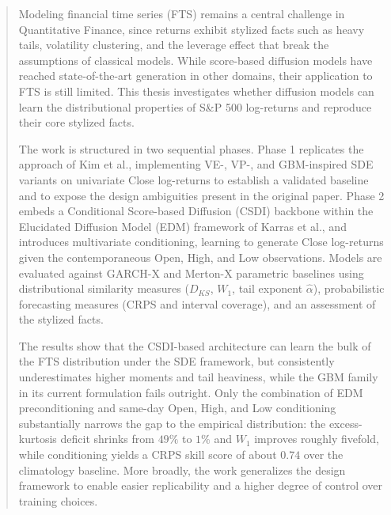 \begin{abstract}
Modeling financial time series (FTS) remains a central challenge in Quantitative Finance, since returns exhibit stylized facts such as heavy tails, volatility clustering, and the leverage effect that break the assumptions of classical models. While score-based diffusion models have reached state-of-the-art generation in other domains, their application to FTS is still limited. This thesis investigates whether diffusion models can learn the distributional properties of S&P 500 log-returns and
reproduce their core stylized facts.

The work is structured in two sequential phases. Phase 1 replicates the approach of
Kim et al., implementing VE-, VP-, and GBM-inspired SDE
variants on univariate Close log-returns to establish a validated baseline and to
expose the design ambiguities present in the original paper. Phase 2 embeds a
Conditional Score-based Diffusion (CSDI) backbone within the Elucidated Diffusion
Model (EDM) framework of Karras et al., and introduces
multivariate conditioning, learning to generate Close log-returns given the
contemporaneous Open, High, and Low observations. Models are evaluated against
GARCH-X and Merton-X parametric baselines using distributional similarity measures
($D_{KS}$, $W_1$, tail exponent $\hat{\alpha}$), probabilistic forecasting measures
(CRPS and interval coverage), and an assessment of the stylized facts.

The results show that the CSDI-based architecture can learn the bulk of the FTS
distribution under the SDE framework, but consistently underestimates higher
moments and tail heaviness, while the GBM family in its current formulation fails outright. Only the combination of EDM preconditioning and same-day Open, High, and Low conditioning
substantially narrows the gap to the empirical distribution: the excess-kurtosis
deficit shrinks from $49\%$ to $1\%$ and $W_1$ improves roughly fivefold, while
conditioning yields a CRPS skill score of about $0.74$ over the climatology
baseline. More broadly, the work generalizes the design framework to enable easier
replicability and a higher degree of control over training choices.
\end{abstract}